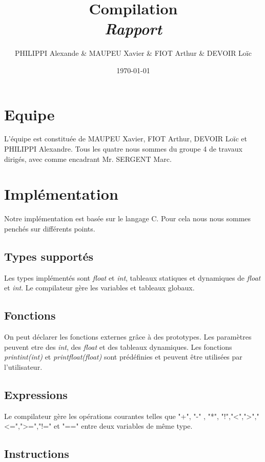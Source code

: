 \documentclass[a4paper,8pt,french,fleqn]{article}
\title{\textbf{Compilation}\\\textit{Rapport}}
\author{PHILIPPI Alexande \& MAUPEU Xavier \& FIOT Arthur \& DEVOIR Loïc}
\date{\today}
\begin{document}
\maketitle

\clearpage

\section*{Equipe}

L'équipe est constituée de MAUPEU Xavier, FIOT Arthur, DEVOIR Loïc et PHILIPPI Alexandre. Tous les quatre nous sommes du groupe 4 de travaux dirigés, avec comme encadrant Mr. SERGENT Marc.


\section{Implémentation}

Notre implémentation est basée sur le langage C. Pour cela nous nous sommes penchés sur différents points.

\subsection{Types supportés}

Les types implémentés sont \textit{float} et \textit{int}, tableaux statiques et dynamiques de \textit{float} et \textit{int}. Le compilateur gère les variables et tableaux globaux.

\subsection{Fonctions}

On peut déclarer les fonctions externes grâce à des prototypes. Les paramètres peuvent etre des \textit{int}, des \textit{float} et des tableaux dynamiques.
Les fonctions \textit{printint(int)} et \textit{printfloat(float)} sont prédéfinies et peuvent être utilisées par l'utilisateur.

\subsection{Expressions}

Le compilateur gère les opérations courantes telles que "+", "-" , "*", "!","<",">","<=",">=","!=" et "==" entre deux variables de même type.\\

\subsection{Instructions}
\end{document}
